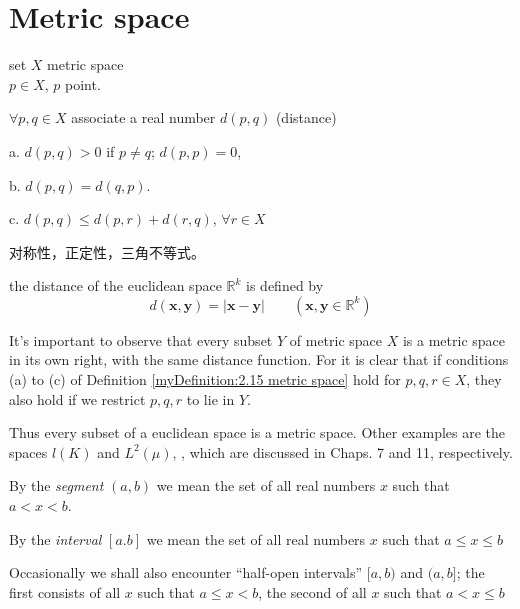 \section{Metric space}
\begin{myDefinition}\label{myDefinition:2.15 metric space}
    set $X$ metric space\\
    $p\in X$, $p$ point.

    $\forall p,q \in X$ associate a real number $d(p,q)$ (distance)

    a. $d(p,q) > 0$ if $p \neq q$; $d(p,p)=0$,

    b. $d(p,q) = d(q,p)$.

    c. $d(p,q) \leq d(p,r) + d(r,q)$, $\forall r\in X$
\end{myDefinition}
对称性，正定性，三角不等式。

\begin{myExample}
    the distance of the euclidean space $\mathbb{R}^k$ is defined by
    \begin{equation}\label{eq:2.19 distance in eulidean space}
        d(\mathbf{x}, \mathbf{y}) = |\mathbf{x} - \mathbf{y}|
        \qquad (\mathbf{x}, \mathbf{y}\in \mathbb{R}^k)
    \end{equation}
\end{myExample}

It's important to observe that every subset $Y$ of metric space $X$ is a metric space in its own right, with the same distance function. For it is clear that if conditions (a) to (c) of Definition \ref{myDefinition:2.15 metric space} hold for $p, q, r \in X$, they also hold if we restrict $p, q, r$ to lie in $Y$.

Thus every subset of a euclidean space is a metric space. Other examples
are the spaces $l(K)$ and $L^2 (\mu)$, 
, which are discussed in Chaps. 7 and 11, respectively.

\begin{myDefinition}\label{myDefinition:2.17 segment}
By the \emph{segment} $(a, b)$ we mean the set of all real numbers $x$
such that $a < x <b$.

By the \emph{interval} $[a. b]$ we mean the set of all real numbers $x$ such that $a \leq x \leq b$

Occasionally we shall also encounter ``half-open intervals'' $[a, b)$ and $(a, b]$; the first consists of all $x$ such that $a \leq x < b$, the second of all $x$ such that $a < x \leq b$
\end{myDefinition}

